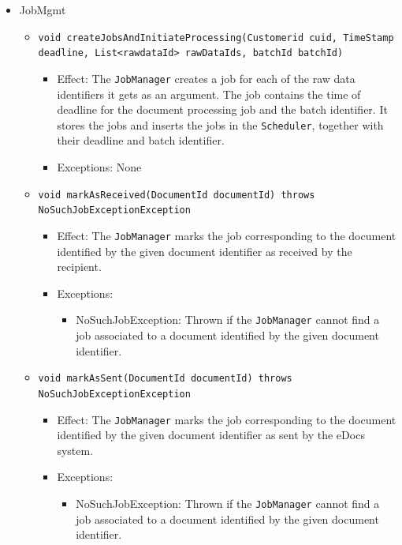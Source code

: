 \documentclass[a4paper,10pt]{article}
\begin{document}
\begin{itemize}
\begin{itemize}
    \end{itemize}    

    \item JobMgmt
    \begin{itemize}
    	\item \texttt{void createJobsAndInitiateProcessing(Customerid cuid, TimeStamp deadline, List<rawdataId> rawDataIds, batchId batchId)}
    	\begin{itemize}
            \item Effect: The \texttt{JobManager} creates a job for each of the raw data identifiers it gets as an argument. The job contains the time of deadline for the document processing job and the batch identifier. It stores the jobs and inserts the jobs in the \texttt{Scheduler}, together with their deadline and batch identifier.
            \item Exceptions: None
        \end{itemize}
    	
    	\item \texttt{void markAsReceived(DocumentId documentId) throws NoSuchJobExceptionException}
    	\begin{itemize}
    		\item Effect: The \texttt{JobManager} marks the job corresponding to the document identified by the given document identifier as received by the recipient.
    		\item Exceptions:
    		\begin{itemize}
    			\item NoSuchJobException: Thrown if the \texttt{JobManager} cannot find a job associated to a document identified by the given document identifier.
    		\end{itemize}
    	\end{itemize}
    	
     	\item \texttt{void markAsSent(DocumentId documentId) throws NoSuchJobExceptionException}
    	\begin{itemize}
    		\item Effect: The \texttt{JobManager} marks the job corresponding to the document identified by the given document identifier as sent by the eDocs system.
    		\item Exceptions:
    		\begin{itemize}
    			\item NoSuchJobException: Thrown if the \texttt{JobManager} cannot find a job associated to a document identified by the given document identifier.
    		\end{itemize}
    	\end{itemize}       	


\end{itemize}
\end{itemize}
\end{document}
